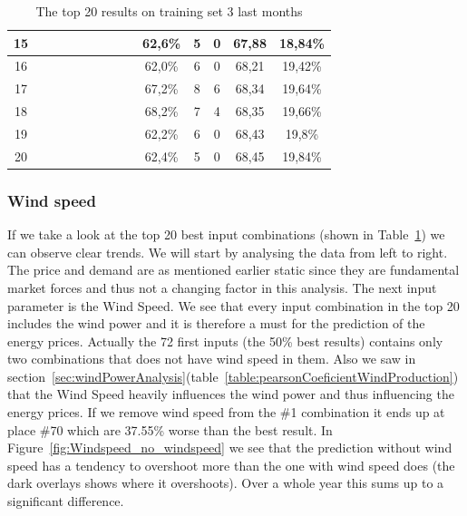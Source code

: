 \begin{table}[H]
{\begin{tabular}{|c|c|c|c|c|c|c|c|c|c|c|c|c|c|}
15 &  \x    & \x    & \x    & \x    & \x    & \x    &       &       & 62,6\% &  5  & 0  & 67,88 & 18,84\% \\ \hline
16 &  \x    & \x    & \x    &       & \x    & \x    &       & \x    & 62,0\% &  6  & 0  & 68,21 & 19,42\% \\ \hline
17 &  \x    & \x    & \x    &       & \x\m  & \x\m  &       &       & 67,2\% &  8  & 6  & 68,34 & 19,64\% \\ \hline
18 &  \x    & \x    & \x    &       & \x\m  &       &       & \x\m  & 68,2\% &  7  & 4  & 68,35 & 19,66\% \\ \hline
19 &  \x    & \x    & \x    & \x    & \x    & \x    & \x    &       & 62,2\% &  6  & 0  & 68,43 & 19,8\% \\ \hline
20 &  \x    & \x    & \x    & \x    & \x    &       &       & \x\m  & 62,4\% &  5  & 0  & 68,45 & 19,84\% \\ \hline
\end{tabular}
}
\caption{The top 20 results on training set 3 last months} %
\label{table:Top20Prices} %
\end{table}

\subsubsection{Wind speed}
If we take a look at the top 20 best input combinations (shown in Table~\ref{table:Top20Prices}) we can observe clear trends. We will start by analysing the data from left to right. The price and demand are as mentioned earlier static since they are fundamental market forces and thus not a changing factor in this analysis. The next input parameter is the Wind Speed. We see that every input combination in the top 20 includes the wind power and it is therefore a must for the prediction of the energy prices. Actually the 72 first inputs (the 50\% best results) contains only two combinations that does not have wind speed in them. Also we saw in section~\ref{sec:windPowerAnalysis}(table~\ref{table:pearsonCoeficientWindProduction}) that the Wind Speed heavily influences the wind power and thus influencing the energy prices. If we remove wind speed from the \#1 combination it ends up at place \#70 which are 37.55\% worse than the best result. In Figure~\ref{fig:Windspeed_no_windspeed} we see that the prediction without wind speed has a tendency to overshoot more than the one with wind speed does (the dark overlays shows where it overshoots). Over a whole year this sums up to a significant difference.


